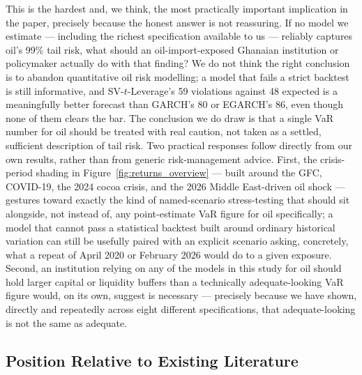 \documentclass[preprint,12pt,authoryear]{elsarticle}
\begin{document}
This is the hardest and, we think, the most practically important implication in the paper, precisely because the honest answer is not reassuring. If no model we estimate --- including the richest specification available to us --- reliably captures oil's 99\% tail risk, what should an oil-import-exposed Ghanaian institution or policymaker actually do with that finding? We do not think the right conclusion is to abandon quantitative oil risk modelling; a model that fails a strict backtest is still informative, and SV-$t$-Leverage's 59 violations against 48 expected is a meaningfully better forecast than GARCH's 80 or EGARCH's 86, even though none of them clears the bar. The conclusion we do draw is that a single VaR number for oil should be treated with real caution, not taken as a settled, sufficient description of tail risk. Two practical responses follow directly from our own results, rather than from generic risk-management advice. First, the crisis-period shading in Figure~\ref{fig:returns_overview} --- built around the GFC, COVID-19, the 2024 cocoa crisis, and the 2026 Middle East-driven oil shock --- gestures toward exactly the kind of named-scenario stress-testing that should sit alongside, not instead of, any point-estimate VaR figure for oil specifically; a model that cannot pass a statistical backtest built around ordinary historical variation can still be usefully paired with an explicit scenario asking, concretely, what a repeat of April 2020 or February 2026 would do to a given exposure. Second, an institution relying on any of the models in this study for oil should hold larger capital or liquidity buffers than a technically adequate-looking VaR figure would, on its own, suggest is necessary --- precisely because we have shown, directly and repeatedly across eight different specifications, that adequate-looking is not the same as adequate.

\subsection{Position Relative to Existing Literature}
\end{document}
